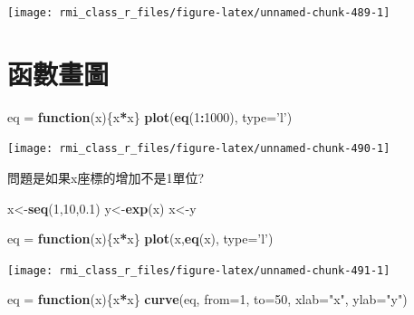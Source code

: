 \documentclass[]{book}
\newenvironment{Shaded}{\begin{snugshade}}{\end{snugshade}}
\newcommand{\ControlFlowTok}[1]{\textcolor[rgb]{0.13,0.29,0.53}{\textbf{#1}}}
\newcommand{\DataTypeTok}[1]{\textcolor[rgb]{0.13,0.29,0.53}{#1}}
\newcommand{\DecValTok}[1]{\textcolor[rgb]{0.00,0.00,0.81}{#1}}
\newcommand{\FloatTok}[1]{\textcolor[rgb]{0.00,0.00,0.81}{#1}}
\newcommand{\KeywordTok}[1]{\textcolor[rgb]{0.13,0.29,0.53}{\textbf{#1}}}
\newcommand{\NormalTok}[1]{#1}
\newcommand{\OperatorTok}[1]{\textcolor[rgb]{0.81,0.36,0.00}{\textbf{#1}}}
\newcommand{\StringTok}[1]{\textcolor[rgb]{0.31,0.60,0.02}{#1}}
\theoremstyle{definition}
\theoremstyle{definition}
\theoremstyle{definition}
\theoremstyle{remark}
\begin{document}
\begin{center}\texttt{[image: rmi\_class\_r\_files/figure-latex/unnamed-chunk-489-1]} \end{center}

\section{函數畫圖}

\begin{Shaded}
\begin{Highlighting}[]
\NormalTok{eq =}\StringTok{ }\ControlFlowTok{function}\NormalTok{(x)\{x}\OperatorTok{*}\NormalTok{x\}}
\KeywordTok{plot}\NormalTok{(}\KeywordTok{eq}\NormalTok{(}\DecValTok{1}\OperatorTok{:}\DecValTok{1000}\NormalTok{), }\DataTypeTok{type=}\StringTok{'l'}\NormalTok{)}
\end{Highlighting}
\end{Shaded}

\begin{center}\texttt{[image: rmi\_class\_r\_files/figure-latex/unnamed-chunk-490-1]} \end{center}

問題是如果x座標的增加不是1單位?

\begin{Shaded}
\begin{Highlighting}[]
\NormalTok{x<-}\KeywordTok{seq}\NormalTok{(}\DecValTok{1}\NormalTok{,}\DecValTok{10}\NormalTok{,}\FloatTok{0.1}\NormalTok{)}
\NormalTok{y<-}\KeywordTok{exp}\NormalTok{(x)}
\NormalTok{x<-y}

\NormalTok{eq =}\StringTok{ }\ControlFlowTok{function}\NormalTok{(x)\{x}\OperatorTok{*}\NormalTok{x\}}
\KeywordTok{plot}\NormalTok{(x,}\KeywordTok{eq}\NormalTok{(x), }\DataTypeTok{type=}\StringTok{'l'}\NormalTok{)}
\end{Highlighting}
\end{Shaded}

\begin{center}\texttt{[image: rmi\_class\_r\_files/figure-latex/unnamed-chunk-491-1]} \end{center}

\begin{Shaded}
\begin{Highlighting}[]
\NormalTok{eq =}\StringTok{ }\ControlFlowTok{function}\NormalTok{(x)\{x}\OperatorTok{*}\NormalTok{x\}}
\KeywordTok{curve}\NormalTok{(eq, }\DataTypeTok{from=}\DecValTok{1}\NormalTok{, }\DataTypeTok{to=}\DecValTok{50}\NormalTok{, }\DataTypeTok{xlab=}\StringTok{"x"}\NormalTok{, }\DataTypeTok{ylab=}\StringTok{"y"}\NormalTok{)}
\end{Highlighting}
\end{Shaded}
\end{document}
